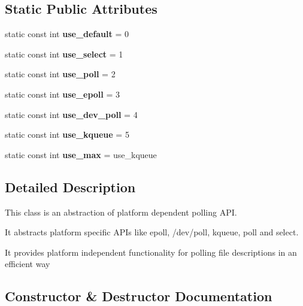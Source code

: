 \subsection*{Static Public Attributes}
\begin{DoxyCompactItemize}
\item 
static const int {\bfseries use\+\_\+default} = 0\label{classbooster_1_1aio_1_1reactor_a4290d35e465605a0668f5a1b2ff21343}

\item 
static const int {\bfseries use\+\_\+select} = 1\label{classbooster_1_1aio_1_1reactor_a2c828351285c7f2f23af9281f052895a}

\item 
static const int {\bfseries use\+\_\+poll} = 2\label{classbooster_1_1aio_1_1reactor_acff40a5e096bd011865aa2639a8906cf}

\item 
static const int {\bfseries use\+\_\+epoll} = 3\label{classbooster_1_1aio_1_1reactor_a4310c6e94162a7749b0d21c5fb511183}

\item 
static const int {\bfseries use\+\_\+dev\+\_\+poll} = 4\label{classbooster_1_1aio_1_1reactor_a10a8f4cde81683d579f2eced63fd1e66}

\item 
static const int {\bfseries use\+\_\+kqueue} = 5\label{classbooster_1_1aio_1_1reactor_a2b3d07c09c0294314c2da0fcb5c24b26}

\item 
static const int {\bfseries use\+\_\+max} = use\+\_\+kqueue\label{classbooster_1_1aio_1_1reactor_ab609c7217451ac2507697939a74eed73}

\end{DoxyCompactItemize}


\subsection{Detailed Description}
This class is an abstraction of platform dependent polling A\+PI. 

It abstracts platform specific A\+P\+Is like epoll, /dev/poll, kqueue, poll and select.

It provides platform independent functionality for polling file descriptions in an efficient way 

\subsection{Constructor \& Destructor Documentation}

